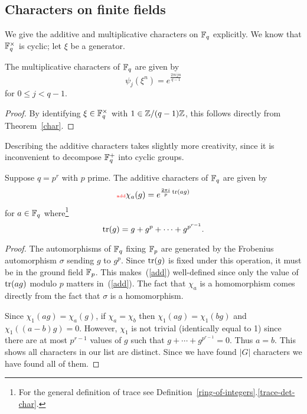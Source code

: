 \subsection{Characters on finite fields}
We give the additive and multiplicative characters on $\mathbb{F}_q$ explicitly. We know that $\mathbb{F}_q^{\times}$ is cyclic; let $\xi$ be a generator. 
\begin{thm}
The multiplicative characters of $\mathbb{F}_q$ are given by
\[
\psi_j(\xi^n)=e^{\frac{2\pi ijn}{q-1}}
\]
for $0\leq j<q-1$.
\end{thm}
\begin{proof}
By identifying $\xi\in \mathbb{F}_q^{\times}$ with $1\in \mathbb{Z}/{(q-1)}\mathbb{Z}$, this follows directly from Theorem~\ref{char}.
\end{proof}
Describing the additive characters takes slightly more creativity, since it is inconvenient to decompose $\mathbb{F}_q^+$ into cyclic groups.
\begin{thm}
Suppose $q=p^r$ with $p$ prime. The additive characters of $\mathbb{F}_q$ are given by
\begin{equation}\llabel{add}
\chi_a(g)=e^{\frac{2\pi i }{p}\tr(ag)}
\end{equation}
for $a\in \mathbb{F}_q$ where\footnote{For the general definition of trace see Definition~\ref{ring-of-integers}.\ref{trace-det-char}.}
\[\operatorname{tr}(g)=g+g^p+\cdots +g^{p^{r-1}}.\]
\end{thm}
\begin{proof}
The automorphisms of $\mathbb{F}_q$ fixing $\mathbb{F}_p$ are generated by the Frobenius automorphism $\sigma$ sending $g$ to $g^p$. Since $\operatorname{tr}(g)$ is fixed under this operation, it must be in the ground field $\mathbb{F}_p$. This makes~(\ref{add}) well-defined since only the value of $\operatorname{tr}(ag)$ modulo $p$ matters in~(\ref{add}). 
The fact that $\chi_a$ is a homomorphism comes directly from the fact that $\sigma$ is a homomorphism.

Since $\chi_1(ag)=\chi_a(g)$, %
if $\chi_a=\chi_b$ then $\chi_1(ag)=\chi_1(bg)$ and $\chi_1((a-b)g)=0$. However, $\chi_1$ is not trivial (identically equal to 1) since there are at most $p^{r-1}$ values of $g$ such that $g+\cdots +g^{p^{r-1}}=0$. Thus $a=b$. This shows all characters in our list are distinct. Since we have found $|G|$ characters we have found all of them.
\end{proof}
